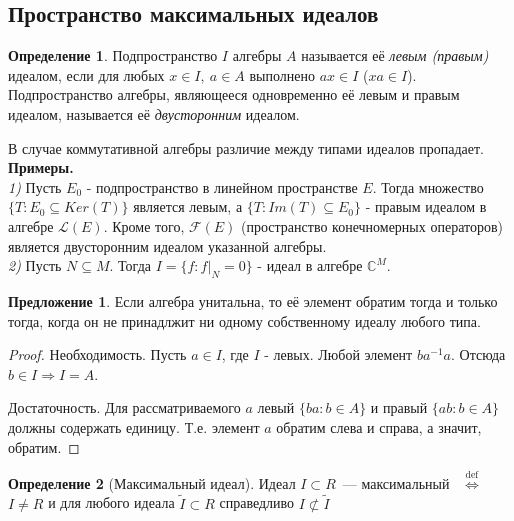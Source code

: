\documentclass[12pt]{extarticle}
\theoremstyle{definition}
\newtheorem{definition}{\indent Определение}[section]
\newtheorem{suggestion}{\indent Предложение}[section]
\newcommand{\iffdef}{\stackrel{\mathrm{def}}{\iff}}
\begin{document}
    \subsection{Пространство максимальных идеалов}
        
        \begin{definition} \label{def: ideal}
        Подпространство $I$ алгебры $A$ называется её \textit{левым (правым)} идеалом, если для любых $x \in I,\ a \in A$ выполнено $ax \in I$ ($xa \in I$). Подпространство алгебры, являющееся одновременно её левым и правым идеалом, называется её \textit{двусторонним} идеалом.
    \end{definition}
    
    В случае коммутативной алгебры различие между типами идеалов пропадает. \\
    
    \textbf{Примеры.} \\
    
    \textit{1)} Пусть $E_0$ - подпространство в линейном пространстве $E$. Тогда множество $\{T : E_0 \subseteq Ker(T)\}$ является левым, а $\{T: Im(T) \subseteq E_0\}$ - правым идеалом в алгебре $\mathcal{L}(E)$. Кроме того, $\mathcal{F}(E)$ (пространство конечномерных операторов) является двусторонним идеалом указанной алгебры. \\
    
    \textit{2)} Пусть $N \subseteq M$. Тогда $I = \{f: f|_N = 0\}$ - идеал в алгебре $\mathds{C}^M$.\\
    
    \begin{suggestion}
    Если алгебра унитальна, то её элемент обратим тогда и только тогда, когда он не принадлжит ни одному собственному идеалу любого типа.
    \end{suggestion}
    \begin{proof}
    Необходимость. Пусть $a \in I$, где $I$ - левых. Любой элемент $ba^{-1}a$. Отсюда $b \in I \Rightarrow I = A$. 
    
    Достаточность. Для рассматриваемого $a$ левый $\{ba: b \in A\}$ и правый $\{ab: b \in A\}$ должны содержать единицу. Т.е. элемент $a$ обратим слева и справа, а значит, обратим. 
    \end{proof}
    
    \begin{definition}[Максимальный идеал]\label{def:Maximal ideal}
        Идеал $I\subset R$~--- максимальный ~$\iffdef$ $I\ne R$ и для любого идеала $\tilde I\subset R$ справедливо $I\nsubset \tilde I$
    \end{definition}
    
\end{document}
